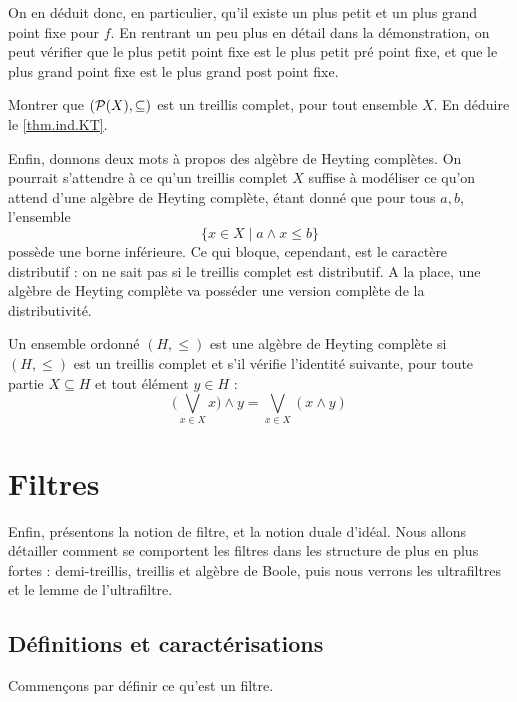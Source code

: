\begin{remark}
  On en déduit donc, en particulier, qu'il existe un plus petit et un plus grand
  point fixe pour $f$. En rentrant un peu plus en détail dans la démonstration,
  on peut vérifier que le plus petit point fixe est le plus petit pré point fixe,
  et que le plus grand point fixe est le plus grand post point fixe.
\end{remark}

\begin{exercise}
  Montrer que $(\mathcal{P}(X),\subseteq)$ est un treillis complet, pour tout
  ensemble $X$. En déduire le \cref{thm.ind.KT}.
\end{exercise}

Enfin, donnons deux mots à propos des algèbre de Heyting complètes. On pourrait
s'attendre à ce qu'un treillis complet $X$ suffise à modéliser ce qu'on attend
d'une algèbre de Heyting complète, étant donné que pour tous $a,b$, l'ensemble
\[\{x \in X \mid a \land x \leq b\}\]
possède une borne inférieure. Ce qui bloque, cependant, est le caractère
distributif : on ne sait pas si le treillis complet est distributif. A la place,
une algèbre de Heyting complète va posséder une version complète de la
distributivité.

\begin{definition}
  Un ensemble ordonné $(H,\leq)$ est une algèbre de Heyting complète si
  $(H,\leq)$ est un treillis complet et s'il vérifie l'identité suivante, pour
  toute partie $X\subseteq H$ et tout élément $y \in H$ :
  \[\Bigg(\bigvee_{x\in X}x\Bigg) \land y = \bigvee_{x\in X}(x\land y)\]
\end{definition}

\section{Filtres}

Enfin, présentons la notion de filtre, et la notion duale d'idéal. Nous allons
détailler comment se comportent les filtres dans les structure de plus en plus
fortes : demi-treillis, treillis et algèbre de Boole, puis nous verrons les
ultrafiltres et le lemme de l'ultrafiltre.

\subsection{Définitions et caractérisations}

Commençons par définir ce qu'est un filtre.

